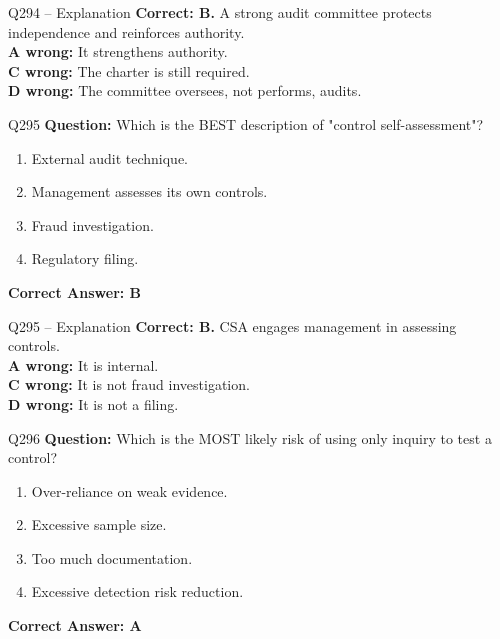 \documentclass[aspectratio=169,10pt]{beamer}
\begin{document}
	\begin{frame}[t]{Q294 -- Explanation}
		\small
		\textbf{Correct: B.} A strong audit committee protects independence and reinforces authority. \\[4pt]
		\textbf{A wrong:} It strengthens authority. \\[2pt]
		\textbf{C wrong:} The charter is still required. \\[2pt]
		\textbf{D wrong:} The committee oversees, not performs, audits.
	\end{frame}
	
	\begin{frame}[t]{Q295}
		\small
		\textbf{Question:} Which is the BEST description of "control self-assessment"?
		\begin{enumerate}[label=\Alph*.,itemsep=1pt,topsep=2pt]
			\item External audit technique.
			\item Management assesses its own controls.
			\item Fraud investigation.
			\item Regulatory filing.
		\end{enumerate}
		\vspace{4pt}
		\textbf{Correct Answer: B}
	\end{frame}
	
	\begin{frame}[t]{Q295 -- Explanation}
		\small
		\textbf{Correct: B.} CSA engages management in assessing controls. \\[4pt]
		\textbf{A wrong:} It is internal. \\[2pt]
		\textbf{C wrong:} It is not fraud investigation. \\[2pt]
		\textbf{D wrong:} It is not a filing.
	\end{frame}
	
	\begin{frame}[t]{Q296}
		\small
		\textbf{Question:} Which is the MOST likely risk of using only inquiry to test a control?
		\begin{enumerate}[label=\Alph*.,itemsep=1pt,topsep=2pt]
			\item Over-reliance on weak evidence.
			\item Excessive sample size.
			\item Too much documentation.
			\item Excessive detection risk reduction.
		\end{enumerate}
		\vspace{4pt}
		\textbf{Correct Answer: A}
	\end{frame}
	
\end{document}
